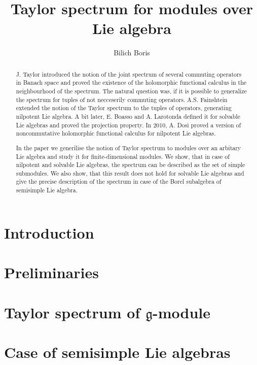 \documentclass[letterpaper]{amsart}
\author{Bilich Boris}
\title{Taylor spectrum for modules over Lie algebra}
\newcommand{\lieg}{\mathfrak{g}}
\begin{document}
\maketitle

\begin{abstract}
    J. Taylor \cite{Taylor1970} introduced the notion of the joint spectrum of several commuting
    operators in Banach space and proved the existence of the holomorphic functional calculus in
    the neighbourhood of the spectrum. The natural question was, if it is possible to generalize
    the spectrum for tuples of not necceserily commuting operators. A.S. Fainshtein extended the
    notion of the Taylor spectrum to the tuples of operators, generating nilpotent Lie algebra. A
    bit later, E. Boasso and A. Larotonda defined it for solvable Lie algebras and proved the
    projection property. In 2010, A. Dosi proved a version of noncommutative holomorphic functional
    calculus for nilpotent Lie algebras.
    
    In the paper we generilise the notion of Taylor spectrum to modules over an arbitary Lie
    algebra and study it for finite-dimensional modules. We show, that in case of nilpotent and
    solvable Lie algebras, the spectrum can be described as the set of simple submodules. We also
    show, that this result does not hold for solvable Lie algebras and give the precise description
    of the spectrum in case of the Borel subalgebra of semisimple Lie algebra.
\end{abstract}

\tableofcontents
\section{Introduction}%
\label{sec:introduction}


\section{Preliminaries}%
\label{sec:preliminaries}


\section{Taylor spectrum of \texorpdfstring{$\lieg$-module}{g-module}}%
\label{sec:spectrumofmodule}


\section{Case of semisimple Lie algebras}%
\label{sec:semisimple}

\end{document}
